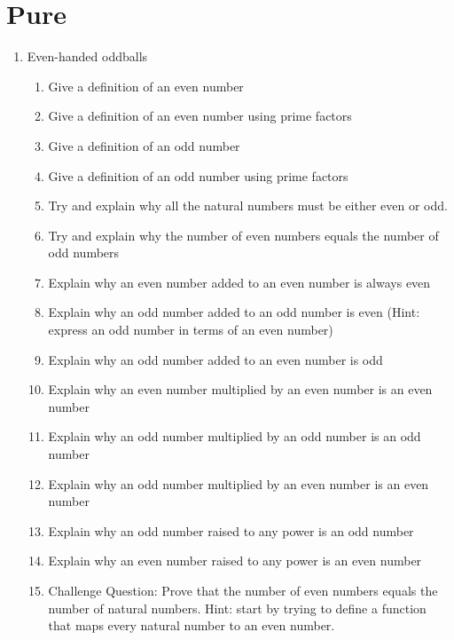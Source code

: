 \documentclass{article}
\begin{document}
\section{Pure}
\begin{enumerate}
    
    \item Even-handed oddballs
    \begin{enumerate}
        \item Give a definition of an even number
        \item Give a definition of an even number using prime factors
        \item Give a definition of an odd number
        \item Give a definition of an odd number using prime factors
        \item Try and explain why all the natural numbers must be either even or odd.
        \item Try and explain why the number of even numbers equals the number of odd numbers
        \item Explain why an even number added to an even number is always even
        \item Explain why an odd number added to an odd number is even (Hint: express an odd number in terms of an even number)
        \item Explain why an odd number added to an even number is odd
        \item Explain why an even number multiplied by an even number is an even number
        \item Explain why an odd number multiplied by an odd number is an odd number
        \item Explain why an odd number multiplied by an even number is an even number
        \item Explain why an odd number raised to any power is an odd number
        \item Explain why an even number raised to any power is an even number
        \item Challenge Question: Prove that the number of even numbers equals the number of natural numbers. Hint: start by trying to define a function that maps every natural number to an even number.
    \end{enumerate}
    

\end{enumerate}
\end{document}
